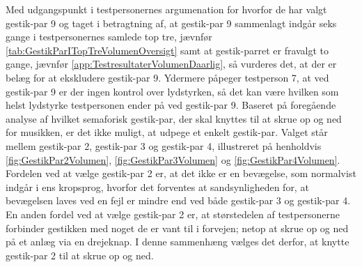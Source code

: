 Med udgangspunkt i testpersonernes argumenation for hvorfor de har valgt gestik-par 9 og taget i betragtning af, at gestik-par 9 sammenlagt indgår seks gange i testpersonernes samlede top tre, jævnfør \autoref{tab:GestikParITopTreVolumenOversigt} samt at gestik-parret er fravalgt to gange, jævnfør \autoref{app:TestresultaterVolumenDaarlig}, så vurderes det, at der er belæg for at ekskludere gestik-par 9. Ydermere påpeger testperson 7, at ved gestik-par 9 er der ingen kontrol over lydstyrken, så det kan være hvilken som helst lydstyrke testpersonen ender på ved gestik-par 9. \blankline
%
Baseret på foregående analyse af hvilket semaforisk gestik-par, der skal knyttes til at skrue op og ned for musikken, er det ikke muligt, at udpege et enkelt gestik-par. Valget står mellem gestik-par 2, gestik-par 3 og gestik-par 4, illustreret på henholdvis \autoref{fig:GestikPar2Volumen}, \autoref{fig:GestikPar3Volumen} og \autoref{fig:GestikPar4Volumen}. Fordelen ved at vælge gestik-par 2 er, at det ikke er en bevægelse, som normalvist indgår i ens kropsprog, hvorfor det forventes at sandsynligheden for, at bevægelsen laves ved en fejl er mindre end ved både gestik-par 3 og gestik-par 4. En anden fordel ved at vælge gestik-par 2 er, at størstedelen af testpersonerne forbinder gestikken med noget de er vant til i forvejen; netop at skrue op og ned på et anlæg via en drejeknap. I denne sammenhæng vælges det derfor, at knytte gestik-par 2 til at skrue op og ned.   

